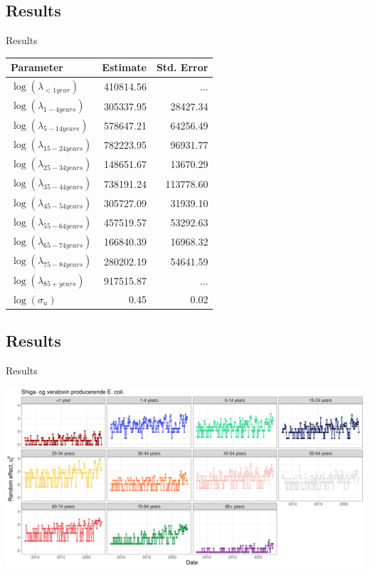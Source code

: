 \documentclass[aspectratio=169]{beamer}
\begin{document}
\hypertarget{results}{%
\subsection{Results}\label{results}}

\begin{frame}{Results}
\tiny

\begin{table}
\centering\begingroup\fontsize{10}{12}\selectfont

\begin{tabular}{lrr}
\toprule
Parameter & Estimate & Std. Error\\
\midrule
$\log(\lambda_{<1 year})$ & 410814.56 & ...\\
$\log(\lambda_{1-4 years})$ & 305337.95 & 28427.34\\
$\log(\lambda_{5-14 years})$ & 578647.21 & 64256.49\\
$\log(\lambda_{15-24 years})$ & 782223.95 & 96931.77\\
$\log(\lambda_{25-34 years})$ & 148651.67 & 13670.29\\
$\log(\lambda_{35-44 years})$ & 738191.24 & 113778.60\\
$\log(\lambda_{45-54 years})$ & 305727.09 & 31939.10\\
$\log(\lambda_{55-64 years})$ & 457519.57 & 53292.63\\
$\log(\lambda_{65-74 years})$ & 166840.39 & 16968.32\\
$\log(\lambda_{75-84 years})$ & 280202.19 & 54641.59\\
$\log(\lambda_{85+ years})$ & 917515.87 & ...\\
$\log(\sigma_u)$ & 0.45 & 0.02\\
\bottomrule
\end{tabular}
\endgroup{}
\end{table}

\normalsize
\end{frame}

\hypertarget{results-1}{%
\subsection{Results}\label{results-1}}

\begin{frame}{Results}
\tiny

\includegraphics[width=1\linewidth]{../figures/PoisLNxSTEC}

\normalsize
\end{frame}
\end{document}
